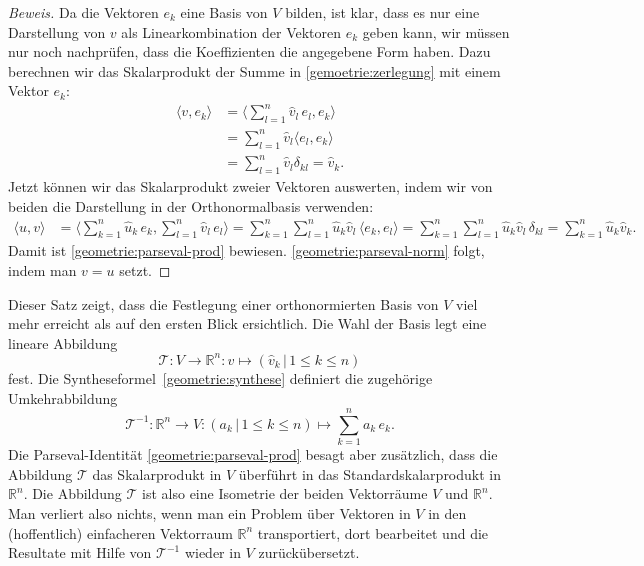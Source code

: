 \begin{proof}[Beweis]
Da die Vektoren $e_k$ eine Basis von $V$ bilden, ist klar, dass es nur
eine Darstellung von $v$ als Linearkombination der Vektoren $e_k$ geben
kann, wir müssen nur noch nachprüfen, dass die Koeffizienten die angegebene
Form haben.
Dazu berechnen wir das Skalarprodukt der Summe in \eqref{gemoetrie:zerlegung}
mit einem Vektor $e_k$:
\begin{align*}
\langle v,e_k\rangle
&=
\biggl\langle \sum_{l=1}^n \hat{v}_l\, e_l,e_k\biggr\rangle
\\
&=
\sum_{l=1}^n \hat{v}_l\langle e_l,e_k\rangle
\\
&=
\sum_{l=1}^n \hat{v}_l\delta_{kl}
=
\hat{v}_k.
\end{align*}
Jetzt können wir das Skalarprodukt zweier Vektoren auswerten, indem
wir von beiden die Darstellung in der Orthonormalbasis verwenden:
\begin{align*}
\langle u,v\rangle
&=
\biggl\langle
\sum_{k=1}^n \hat{u}_k\, e_k,\sum_{l=1}^n \hat{v}_l\, e_l
\biggr\rangle
=
\sum_{k=1}^n \sum_{l=1}^n \hat{u}_k\hat{v}_l\, \langle e_k,e_l\rangle
=
\sum_{k=1}^n \sum_{l=1}^n \hat{u}_k\hat{v}_l\, \delta_{kl}
=
\sum_{k=1}^n \hat{u}_k\hat{v}_k.
\end{align*}
Damit ist \eqref{geometrie:parseval-prod} bewiesen.
\eqref{geometrie:parseval-norm} folgt, indem man $v=u$ setzt.
\end{proof}

Dieser Satz zeigt, dass die Festlegung einer orthonormierten Basis von $V$
viel mehr erreicht als auf den ersten Blick ersichtlich.
Die Wahl der Basis legt eine lineare Abbildung
\[
\mathcal{T}
\colon
V\to \mathbb R^n
:
v \mapsto (\hat{v}_k\,|\, 1\le k\le n)
\]
fest.
Die Syntheseformel~\eqref{geometrie:synthese} definiert die zugehörige
Umkehrabbildung
\[
\mathcal{T}^{-1}
\colon
\mathbb R^n \to V
:
(a_k\,|\,1\le k \le n)
\mapsto
\sum_{k=1}^n a_k\,e_k.
\]
Die Parseval-Identität
\eqref{geometrie:parseval-prod} besagt aber zusätzlich, dass
die Abbildung $\mathcal{T}$ das Skalarprodukt in $V$ überführt in
das Standardskalarprodukt in $\mathbb R^n$.
Die Abbildung $\mathcal{T}$ ist also eine Isometrie der beiden Vektorräume
$V$ und $\mathbb R^n$.
Man verliert also nichts, wenn man ein Problem über Vektoren in $V$ in
den (hoffentlich) einfacheren Vektorraum $\mathbb R^n$ transportiert,
dort bearbeitet und die Resultate mit Hilfe von $\mathcal{T}^{-1}$
wieder in $V$ zurückübersetzt.



